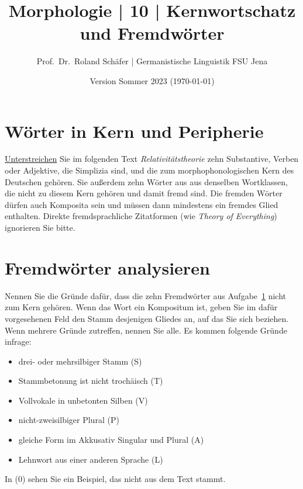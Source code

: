 \documentclass[12pt,a4paper,twoside]{article}
\author{Prof.\ Dr.\ Roland Schäfer | Germanistische Linguistik FSU Jena}
\title{Morphologie | 10 | Kernwortschatz und Fremdwörter}
\date{Version Sommer 2023 (\today)}
\newcommand{\Zeile}{\vspace{\baselineskip}}
\newcommand*{\mybox}[1]{\framebox{#1}}
\newcommand{\Lf}{
  \setlength{\itemsep}{1pt}
  \setlength{\parskip}{0pt}
  \setlength{\parsep}{0pt}
}
\begin{document}
\maketitle

\Zeile

\section{Wörter in Kern und Peripherie}\label{sec:woerter}

\ul{Unterstreichen} Sie im folgenden Text \textit{Relativitätstheorie} zehn Substantive, Verben oder Adjektive, die Simplizia sind, und die zum morphophonologischen Kern des Deutschen gehören.
\mybox{Umrahmen} Sie außerdem zehn Wörter aus aus denselben Wortklassen, die nicht zu diesem Kern gehören und damit fremd sind.
Die fremden Wörter dürfen auch Komposita sein und müssen dann mindestens ein fremdes Glied enthalten.
Direkte fremdsprachliche Zitatformen (wie \textit{Theory of Everything}) ignorieren Sie bitte.

\section{Fremdwörter analysieren}\label{sec:analyse}

Nennen Sie die Gründe dafür, dass die zehn Fremdwörter aus Aufgabe~\ref{sec:woerter} nicht zum Kern gehören.
Wenn das Wort ein Kompositum ist, geben Sie im dafür vorgesehenen Feld den Stamm desjenigen Gliedes an, auf das Sie sich beziehen.
Wenn mehrere Gründe zutreffen, nennen Sie alle.
Es kommen folgende Gründe infrage:

\begin{itemize}\Lf
  \item drei- oder mehrsilbiger Stamm (S)
  \item Stammbetonung ist nicht trochäisch (T)
  \item Vollvokale in unbetonten Silben (V)
  \item nicht-zweisilbiger Plural (P)
  \item gleiche Form im Akkusativ Singular und Plural (A)
  \item Lehnwort aus einer anderen Sprache (L)
\end{itemize}

In (0) sehen Sie ein Beispiel, das nicht aus dem Text stammt.
\end{document}
